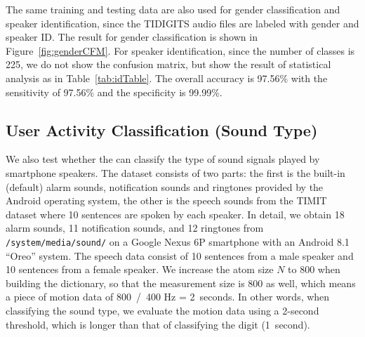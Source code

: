 The same training and testing data are also used for gender classification and speaker identification, since the TIDIGITS audio files are labeled with gender and speaker ID. The result for gender classification is shown in Figure~\ref{fig:genderCFM}.
For speaker identification, since the number of classes is 225, we do not show the confusion matrix, but show the result of statistical analysis as in Table~\ref{tab:idTable}. The overall accuracy is 97.56\% with the sensitivity of 97.56\% and the specificity is 99.99\%.




\subsection{User Activity Classification (Sound Type)}


We also test whether the {\systemName} can classify the type of sound signals played by smartphone speakers. The dataset consists of two parts: the first is the built-in (default) alarm sounds, notification sounds and ringtones provided by the Android operating system, the other is the speech sounds from the TIMIT~\cite{garofolo1993timit} dataset where 10 sentences are spoken by each speaker.
%
In detail, we obtain 18 alarm sounds, 11 notification sounds, and 12 ringtones from \verb|/system/media/sound/| on a Google Nexus 6P smartphone with an Android 8.1 ``Oreo'' system. The speech data consist of 10 sentences from a male speaker and 10 sentences from a female speaker. We increase the atom size $N$ to 800 when building the dictionary, so that the measurement size is 800 as well, which means a piece of motion data of 800~/~400 Hz = 2~seconds. In other words, when classifying the sound type, we evaluate the motion data using a 2-second threshold, which is longer than that of classifying the digit (1~second).


